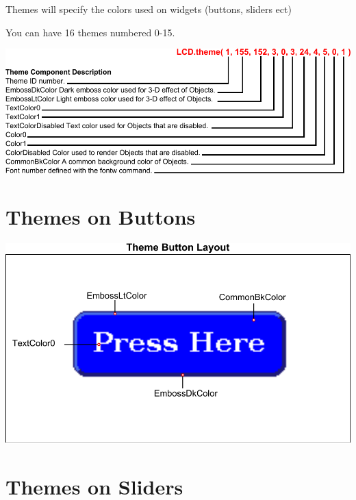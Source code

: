 Themes will specify the colors used on widgets (buttons, sliders ect)\par
 You can have 16 themes numbered 0-\/15. \par
  
\begin{DoxyImageNoCaption}
  \mbox{\includegraphics{themes}}
\end{DoxyImageNoCaption}
 \hypertarget{intro_themes_themeButton}{}\section{Themes on Buttons}\label{intro_themes_themeButton}
 
\begin{DoxyImageNoCaption}
  \mbox{\includegraphics{themeButton}}
\end{DoxyImageNoCaption}
 \hypertarget{intro_themes_themeSlider}{}\section{Themes on Sliders}\label{intro_themes_themeSlider}
 
